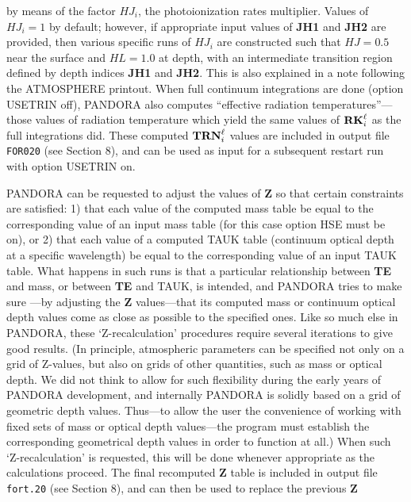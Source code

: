 by means of the factor $HJ_i$, the photoionization rates multiplier.
Values of $HJ_i = 1$ by default; however, if appropriate input values
of {\bf JH1} and {\bf JH2} are provided, then various specific runs of
$HJ_i$ are constructed such that $HJ = 0.5$ near the surface and
$HL = 1.0$ at depth, with an intermediate transition region defined
by depth indices {\bf JH1} and {\bf JH2}. This is also explained in
a note following the ATMOSPHERE printout. \np
When full continuum integrations are done (option USETRIN off),
PANDORA also computes ``effective radiation temperatures''---\ie 
those values of radiation temperature which yield the same values of
${\bf RK}^\ell_i$ as the full integrations did. These computed
${\bf TRN}^\ell_i$ values are included in output file {\tt FOR020}
(see Section 8), and can be used as input for a subsequent 
restart run with option USETRIN on.
\ej
\centerline{}
\space \noindent
PANDORA can be requested to adjust the values 
of {\bf Z} so that certain constraints are satisfied: 1) that each value
of the computed mass table be equal to the corresponding value of 
an input mass table (for this case option HSE must be on),
or 2) that each value of a computed TAUK table
(continuum optical depth at a specific wavelength) be equal to the
corresponding value of an input TAUK table. \np
What happens in such runs is that a particular relationship between
{\bf TE} and mass, or between {\bf TE} and TAUK, is intended, and
PANDORA tries to make sure ---by adjusting the {\bf Z} values---that its
computed mass or continuum optical depth values come as close as
possible to the specified ones. Like so much else in PANDORA, these
`Z-recalculation' procedures require several iterations to give 
good results. \np
(In principle, atmospheric parameters can be specified not only on
a grid of Z-values, but also on grids of other quantities, such as
mass or optical depth. We did not think to allow for such flexibility 
during the early years of PANDORA development, and internally PANDORA
is solidly based on a grid of geometric depth values. Thus---to
allow the user the convenience of working with fixed sets of
mass or optical depth values---the program must establish the
corresponding geometrical depth values in order to function at
all.) \np
When such `Z-recalculation' is requested, this will be done whenever
appropriate as the calculations proceed. \np
The final recomputed {\bf Z} table is included in output file {\tt fort.20}
(see Section 8), and can then be used to replace the previous {\bf Z}
